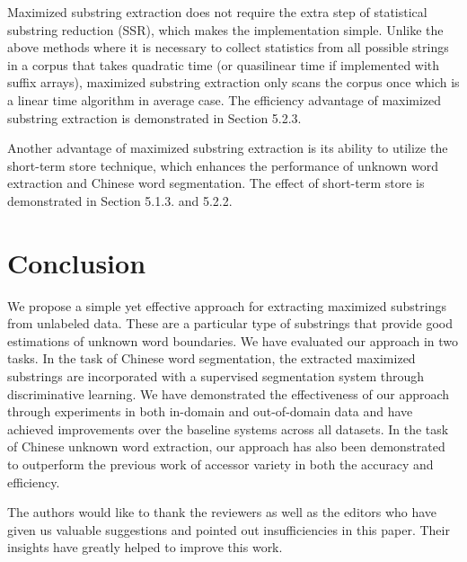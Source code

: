 \documentclass[english]{jnlp_1.4}
\begin{document}
Maximized substring extraction does not require the extra step of statistical substring reduction (SSR), which makes the implementation simple. Unlike the above methods where it is necessary to collect statistics from all possible strings in a corpus that takes quadratic time (or quasilinear time if implemented with suffix arrays), maximized substring extraction only scans the corpus once which is a linear time algorithm in average case. The efficiency advantage of maximized substring extraction is demonstrated in Section 5.2.3.

Another advantage of maximized substring extraction is its ability to utilize the short-term store technique, which enhances the performance of unknown word extraction and Chinese word segmentation. The effect of short-term store is demonstrated in Section 5.1.3. and 5.2.2.


\section{Conclusion}

We propose a simple yet effective approach for extracting maximized substrings from unlabeled data. These are a particular type of substrings that provide good estimations of unknown word boundaries. We have evaluated our approach in two tasks. In the task of Chinese word segmentation, the extracted maximized substrings are incorporated with a supervised segmentation system through discriminative learning. We have demonstrated the effectiveness of our approach through experiments in both in-domain and out-of-domain data and have achieved improvements over the baseline systems across all datasets. In the task of Chinese unknown word extraction, our approach has also been demonstrated to outperform the previous work of accessor variety in both the accuracy and efficiency.


\acknowledgment
The authors would like to thank the reviewers as well as the editors who have given us valuable suggestions and pointed out insufficiencies in this paper. Their insights have greatly helped to improve this work.
\end{document}

